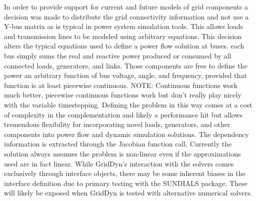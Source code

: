 \documentclass[12pt]{article} %
\begin{document}
In order to provide support for current and future models of grid components a decision was made to distribute the grid connectivity information and not use a Y-bus matrix as is typical in power system simulation tools.  This allows loads and transmission lines to be modeled using arbitrary equations.  This decision alters the typical equations used to define a power flow solution at buses.  each bus simply sums the real and reactive power produced or consumed by all connected loads, generators, and links.  Those components are free to define the power an arbitrary function of bus voltage, angle, and frequency,  provided that function is at least piecewise continuous.  NOTE:  Continuous functions work much better, piecewise continuous functions work but don't really play nicely with the variable timestepping.  Defining the problem in this way comes at a cost of complexity in the complementation and likely a performance hit but allows tremendous flexibility for incorporating novel loads, generators, and other components into power flow and dynamic simulation solutions.  The dependency information is extracted through the Jacobian function call. Currently the solution always assumes the problem is non-linear even if the approximations used are in fact linear.  While GridDyn's interaction with the solvers comes exclusively through interface objects, there may be some inherent biases in the interface definition due to primary testing with the SUNDIALS package.  These will likely be exposed when GridDyn is tested with alternative numerical solvers.
\end{document}
